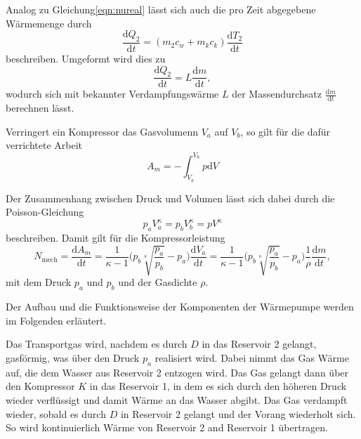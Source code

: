 Analog zu Gleichung\ref{eqn:nureal} lässt sich auch die pro Zeit abgegebene Wärmemenge durch 
\begin{equation}
    \frac{\text{d}Q_2}{\text{d}t} = (m_2c_w + m_kc_k)\frac{\text{d}T_2}{\text{d}t} 
\end{equation}
beschreiben. Umgeformt wird dies zu 
\begin{equation}
    \frac{\text{d}Q_2}{\text{d}t} = L\frac{\text{d}m}{\text{d}t},
    \label{eqn:mass}
\end{equation}
wodurch sich mit bekannter Verdampfungswärme $L$ der Massendurchsatz $\frac{\text{d}m}{\text{d}t}$ berechnen lässt.

Verringert ein Kompressor das Gasvolumenn $V_a$ auf $V_b$, so gilt für die dafür verrichtete Arbeit
\begin{equation}
    A_m = - \int_{V_a}^{V_b} p\text{d}V
\end{equation}

Der Zusammenhang zwischen Druck und Volumen lässt sich dabei durch die Poisson-Gleichung 
\begin{equation}
    p_aV_a^\kappa = p_bV_b^\kappa = pV^\kappa
\end{equation}
beschreiben. Damit gilt für die Kompressorleistung
\begin{equation}
    N_{\text{mech}} = \frac{\text{d}A_m}{\text{d}t} = \frac{1}{\kappa -1} \biggl(p_b \sqrt[\kappa]{\frac{p_a}{p_b}}-p_a \biggr)\frac{\text{d}V_a}{\text{d}t}
    = \frac{1}{\kappa -1} \biggl(p_b \sqrt[\kappa]{\frac{p_a}{p_b}}-p_a \biggr)\frac{1}{\rho}\frac{\text{d}m}{\text{d}t},
    \label{eqn:N_mech}
\end{equation}
mit dem Druck $p_a$ und $p_b$ und der Gasdichte $\rho$.

Der Aufbau und die Funktionsweise der Komponenten der Wärmepumpe werden im Folgenden erläutert.

Das Transportgas wird, nachdem es durch $D$ in das Reservoir 2 gelangt, gasförmig, was über den Druck $p_a$ realisiert wird.
Dabei nimmt das Gas Wärme auf, die dem Wasser aus Reservoir 2 entzogen wird. Das Gas gelangt dann über den Kompressor $K$ in das 
Reservoir 1, in dem es sich durch den höheren Druck wieder verflüssigt und damit Wärme an das Wasser abgibt. Das Gas verdampft 
wieder, sobald es durch $D$ in Reservoir 2 gelangt und der Vorang wiederholt sich. So wird kontinuierlich Wärme von Reservoir 2
and Reservoir 1 übertragen.




